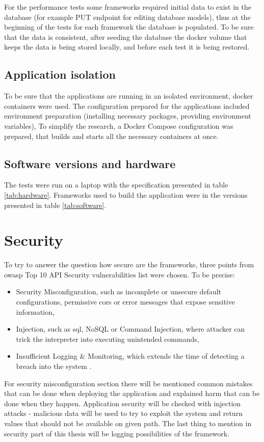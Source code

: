 For the performance tests some frameworks required initial data to exist in the database (for example PUT endpoint for editing database models), thus at the beginning of the tests for each framework the database is populated. To be sure that the data is consistent, after seeding the database the docker volume that keeps the data is being stored locally, and before each test it is being restored.

\subsection{Application isolation}

To be sure that the applications are running in an isolated environment, docker containers were used. The configuration prepared for the applications included environment preparation (installing necessary packages, providing environment variables), To simplify the research, a Docker Compose configuration was prepared, that builds and starts all the necessary containers at once.

\subsection{Software versions and hardware}

The tests were run on a laptop with the specification presented in table \ref{tab:hardware}.
Frameworks used to build the application were in the versions presented in table \ref{tab:software}.





\section{Security}
To try to answer the question how secure are the frameworks, three points from \acrshort{owasp} Top 10 API Security vulnerabilities list were chosen. To be precise:
\begin{itemize}
  \item Security Misconfiguration, such as incomplete or unsecure default configurations, permissive \acrshort{cors} or error messages that expose sensitive information,
  \item Injection, such as \acrshort{sql}, NoSQL or Command Injection, where attacker can trick the interpreter into executing unintended commands,
  \item Insufficient Logging \& Monitoring, which extends the time of detecting a breach into the system \cite{owaspTop10}.
\end{itemize}
For security misconfiguration section there will be mentioned common mistakes that can be done when deploying the application and explained harm that can be done when they happen.
Application security will be checked with injection attacks - malicious data will be used to try to exploit the system and return values that should not be available on given path.
The last thing to mention in security part of this thesis will be logging possibilities of the framework.
